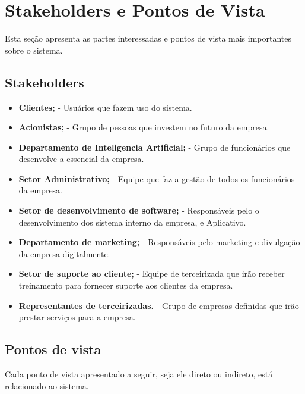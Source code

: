 

\section{Stakeholders e Pontos de Vista}
Esta seção apresenta as partes interessadas e pontos de vista mais importantes sobre o sistema.
\subsection{Stakeholders}

\begin{itemize}
      \item \textbf{Clientes;}
            \subitem - Usuários que fazem uso do sistema.
      \item \textbf{ Acionistas;}
            \subitem - Grupo de pessoas que investem no futuro da empresa.
      \item \textbf{Departamento de Inteligencia Artificial;}
            \subitem - Grupo de funcionários que desenvolve a essencial da empresa.
      \item \textbf{ Setor Administrativo;}
            \subitem - Equipe que faz a gestão de todos os funcionários da empresa.
      \item  \textbf{ Setor de desenvolvimento de software;}
            \subitem - Responsáveis pelo o desenvolvimento dos sistema interno da empresa, e Aplicativo.
      \item \textbf{ Departamento de marketing;}
            \subitem - Responsáveis pelo marketing e divulgação da empresa digitalmente.
      \item \textbf{ Setor de suporte ao cliente;}
            \subitem - Equipe de terceirizada que irão receber treinamento para fornecer suporte aos clientes da empresa.
      \item \textbf{ Representantes de terceirizadas.}
            \subitem - Grupo de empresas definidas que irão prestar serviços para a empresa.
\end{itemize}



\subsection{Pontos de vista}

Cada ponto de vista apresentado a seguir, seja ele direto ou indireto, está relacionado ao sistema.
